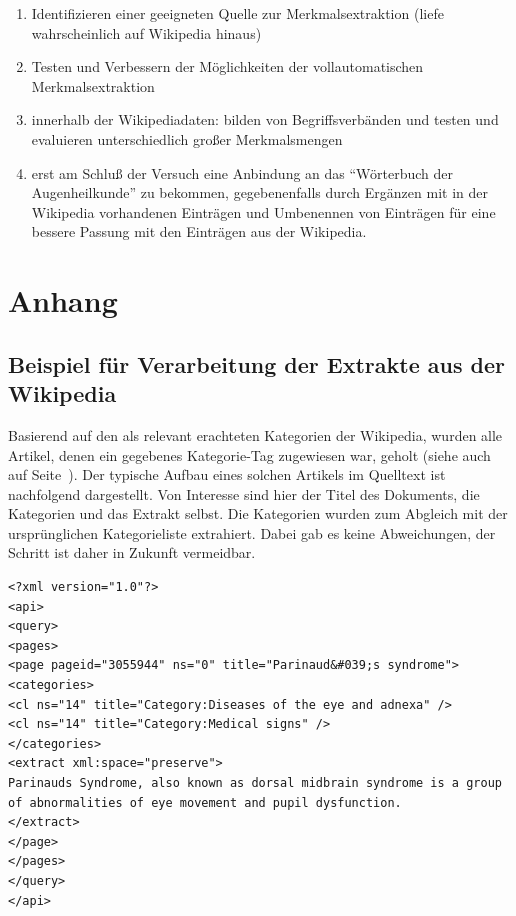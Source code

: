 \documentclass[pagesize,paper=A4,DIV=calc,fontsize=12pt,draft=false]{scrreprt}
\begin{document}
\begin{enumerate}
    \item Identifizieren einer geeigneten Quelle zur Merkmalsextraktion (liefe wahrscheinlich auf Wikipedia hinaus)
    \item Testen und Verbessern der Möglichkeiten der vollautomatischen Merkmalsextraktion
    \item innerhalb der Wikipediadaten: bilden von Begriffsverbänden und testen und evaluieren unterschiedlich großer Merkmalsmengen
    \item erst am Schluß der Versuch eine Anbindung an das \enquote{Wörterbuch der Augenheilkunde} zu bekommen, gegebenenfalls durch Ergänzen mit in der Wikipedia vorhandenen Einträgen und Umbenennen von Einträgen für eine bessere Passung mit den Einträgen aus der Wikipedia.
\end{enumerate}


\chapter{Anhang}

\section{Beispiel für Verarbeitung der Extrakte aus der Wikipedia}

Basierend auf den als relevant erachteten Kategorien der Wikipedia, wurden alle Artikel, denen ein gegebenes Kategorie-Tag zugewiesen war, geholt (siehe auch \emph{~} auf Seite~\pageref{subsec:wiki_cats}).
Der typische Aufbau eines solchen Artikels im Quelltext ist nachfolgend dargestellt.
Von Interesse sind hier der Titel des Dokuments, die Kategorien und das Extrakt selbst.
Die Kategorien wurden zum Abgleich mit der ursprünglichen Kategorieliste extrahiert.
Dabei gab es keine Abweichungen, der Schritt ist daher in Zukunft vermeidbar. 

\lstset{
language=XML
}

\begin{lstlisting}[caption={XML-Quelltext eines typischen Artikels der Wikipedia: \enquote{Parinaud's syndrome}}]
<?xml version="1.0"?>
<api>
<query>
<pages>
<page pageid="3055944" ns="0" title="Parinaud&#039;s syndrome">
<categories>
<cl ns="14" title="Category:Diseases of the eye and adnexa" />
<cl ns="14" title="Category:Medical signs" />
</categories>
<extract xml:space="preserve">
Parinauds Syndrome, also known as dorsal midbrain syndrome is a group of abnormalities of eye movement and pupil dysfunction.
</extract>
</page>
</pages>
</query>
</api>
\end{lstlisting}
\end{document}
